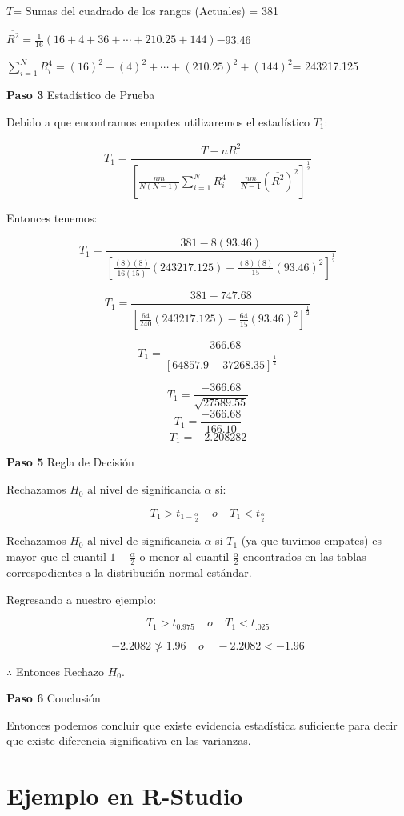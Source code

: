 \documentclass[
  a4paper,
  oneside,
  openany]{book}
\begin{document}
\(T\)= Sumas del cuadrado de los rangos (Actuales) = 381

\(\overline{R^2}= \frac{1}{16}\left(16+4+36+\cdots+210.25+144\right)\)=93.46

\(\sum_{i=1}^{N}R_{i}^4= (16)^2+(4)^2+\cdots+(210.25)^2+(144)^2\)= 243217.125

\textbf{Paso 3} Estadístico de Prueba

Debido a que encontramos empates utilizaremos el estadístico \(T_{1}\):

\[T_{1} = \frac{T-n\overline{R^2}}{\left[\frac{nm}{N(N-1)}\sum_{i=1}^{N}R_{i}^4-\frac{nm}{N-1}(\overline{R^2})^2\right]^\frac{1}{2}}\]

Entonces tenemos:

\[T_{1} = \frac{381-8(93.46)}{\left[\frac{(8)(8)}{16(15)}(243217.125)-\frac{(8)(8)}{15}(93.46)^2\right]^\frac{1}{2}}\]

\[T_{1} = \frac{381-747.68}{\left[\frac{64}{240}(243217.125)-\frac{64}{15}(93.46)^2\right]^\frac{1}{2}}\]

\[T_{1} = \frac{-366.68}{[64857.9-37268.35]^\frac{1}{2}}\]

\[T_{1} = \frac{-366.68}{\sqrt{27589.55}}\]
\[T_{1} = \frac{-366.68}{166.10}\]
\[T_{1}= -2.208282\]

\textbf{Paso 5} Regla de Decisión

Rechazamos \(H_0\) al nivel de significancia \(\alpha\) si:

\[T_{1}>t_{1-\frac{\alpha}{2}} \ \ \ \ \  o  \ \ \ \ \ T_{1}<t_{\frac{\alpha}{2}}\]

Rechazamos \(H_0\) al nivel de significancia \(\alpha\) si \(T_{1}\) (ya que tuvimos empates) es mayor que el cuantil \(1-\frac{\alpha}{2}\) o menor al cuantil \(\frac{\alpha}{2}\) encontrados en las tablas correspodientes a la distribución normal estándar.

Regresando a nuestro ejemplo:

\[T_{1}>t_{0.975} \ \ \ \ \  o \ \ \ \ \ T_{1}<t_{.025}\]

\[-2.2082 \ngtr 1.96  \ \ \ \ \   o  \ \ \ \ \  -2.2082 < -1.96\]

\(\therefore\) Entonces Rechazo \(H_0\).

\textbf{Paso 6} Conclusión

Entonces podemos concluir que existe evidencia estadística suficiente para decir que existe diferencia significativa en las varianzas.

\hypertarget{ejemplo-en-r-studio-7}{%
\section{Ejemplo en R-Studio}\label{ejemplo-en-r-studio-7}}
\end{document}
